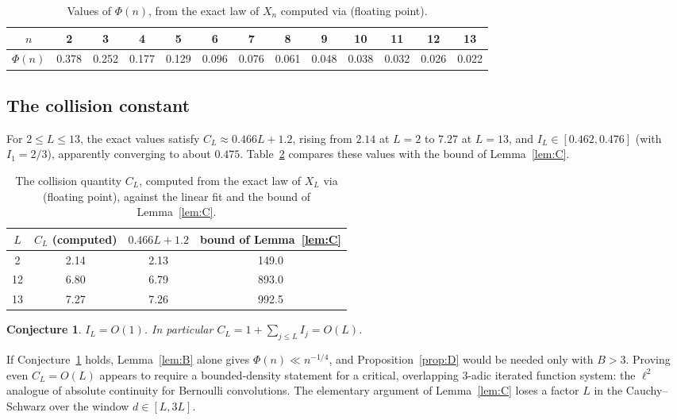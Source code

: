 \documentclass[11pt]{amsart}
\newtheorem{conjecture}{Conjecture}[section]
\theoremstyle{remark}
\newcommand{\T}[1]{\cite[#1]{Tao22}}   %
\theoremstyle{plain}
\begin{document}
\begin{table}[h]
\centering
\small
\begin{tabular}{@{}c|cccccccccccc@{}}
\toprule
$n$ & 2 & 3 & 4 & 5 & 6 & 7 & 8 & 9 & 10 & 11 & 12 & 13 \\
\midrule
$\Phi(n)$ & 0.378 & 0.252 & 0.177 & 0.129 & 0.096 & 0.076 & 0.061 & 0.048 & 0.038 & 0.032 & 0.026 & 0.022 \\
\bottomrule
\end{tabular}
\caption{Values of $\Phi(n)$, from the exact law of $X_n$ computed via \T{Lemma 1.12} (floating point).}\label{tab:Phi}
\end{table}

\subsection{The collision constant}
For $2\le L\le13$, the exact values satisfy $C_L\approx0.466L+1.2$, rising from $2.14$ at $L=2$ to $7.27$ at $L=13$, and $I_L\in[0.462,0.476]$ (with $I_1=2/3$), apparently converging to about $0.475$. Table~\ref{tab:CL} compares these values with the bound of Lemma~\ref{lem:C}.

\begin{table}[h]
\centering
\small
\begin{tabular}{@{}cccc@{}}
\toprule
$L$ & $C_L$ (computed) & $0.466L+1.2$ & bound of Lemma~\ref{lem:C} \\
\midrule
2  & 2.14 & 2.13 & 149.0 \\
12 & 6.80 & 6.79 & 893.0 \\
13 & 7.27 & 7.26 & 992.5 \\
\bottomrule
\end{tabular}
\caption{The collision quantity $C_L$, computed from the exact law of $X_L$ via \T{Lemma 1.12} (floating point), against the linear fit and the bound of Lemma~\ref{lem:C}.}\label{tab:CL}
\end{table}

\begin{conjecture}\label{conj:IL}
$I_L=O(1)$. In particular $C_L=1+\sum_{j\le L}I_j=O(L)$.
\end{conjecture}

If Conjecture~\ref{conj:IL} holds, Lemma~\ref{lem:B} alone gives $\Phi(n)\ll n^{-1/4}$, and Proposition~\ref{prop:D} would be needed only with $B>3$. Proving even $C_L=O(L)$ appears to require a bounded-density statement for a critical, overlapping $3$-adic iterated function system: the $\ell^2$ analogue of absolute continuity for Bernoulli convolutions. The elementary argument of Lemma~\ref{lem:C} loses a factor $L$ in the Cauchy--Schwarz over the window $d\in[L,3L]$.
\end{document}
